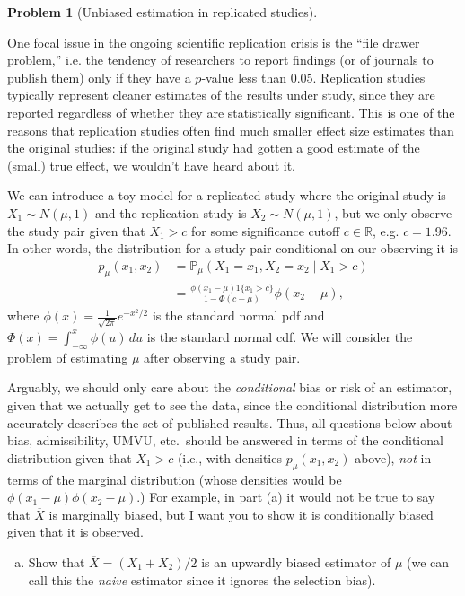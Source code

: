 \documentclass{article}
\newcommand{\PP}{\mathbb{P}}
\newcommand{\RR}{\mathbb{R}}
\theoremstyle{definition}
\newtheorem{problem}{Problem}
\begin{document}
\begin{problem}[Unbiased estimation in replicated studies]
\label{prob:unbiased-replication}

One focal issue in the ongoing scientific replication crisis is the ``file drawer problem,'' i.e. the tendency of researchers to report findings (or of journals to publish them) only if they have a $p$-value less than 0.05. Replication studies typically represent cleaner estimates of the results under study, since they are reported regardless of whether they are statistically significant. This is one of the reasons that replication studies often find much smaller effect size estimates than the original studies: if the original study had gotten a good estimate of the (small) true effect, we wouldn't have heard about it.

We can introduce a toy model for a replicated study where the original study is $X_1 \sim N(\mu, 1)$ and the replication study is $X_2 \sim N(\mu, 1)$, but we only observe the study pair given that $X_1 > c$ for some significance cutoff $c \in \RR$, e.g. $c=1.96$. In other words, the distribution for a study pair conditional on our observing it is
\begin{align*}
p_\mu(x_1,x_2) &= \PP_\mu(X_1=x_1,X_2=x_2 \mid X_1 > c)\\
  &= \frac{\phi(x_1-\mu)1\{x_1 > c\}}{1-\Phi(c-\mu)} \phi(x_2-\mu),
\end{align*}
where $ \phi(x) = \frac{1}{\sqrt{2\pi}}e^{-x^2/2}$ is the standard normal pdf and $\Phi(x) =  \int_{-\infty}^x \phi(u)\,d  u$ is the standard normal cdf. We will consider the problem of estimating $\mu$ after observing a study pair.

Arguably, we should only care about the {\em conditional} bias or risk of an estimator, given that we actually get to see the data, since the conditional distribution more accurately describes the set of published results. Thus, all questions below about bias, admissibility, UMVU, etc.\, should be answered in terms of the conditional distribution given that $X_1>c$ (i.e., with densities $p_{\mu}(x_1,x_2)$ above), {\em not} in terms of the marginal distribution (whose densities would be $\phi(x_1-\mu)\phi(x_2-\mu)$.) For example, in part (a) it would not be true to say that $\overline X$ is marginally biased, but I want you to show it is conditionally biased given that it is observed.

\begin{enumerate}[(a)]
\item Show that $\overline X = (X_1 + X_2)/2$ is an upwardly biased estimator of $\mu$ (we can call this the {\em naive} estimator since it ignores the selection bias).




\end{enumerate}
\end{problem}
\end{document}
